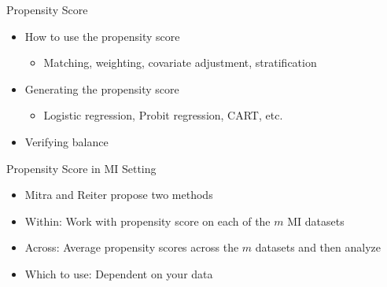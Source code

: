 \begin{frame}{Propensity Score}
\begin{itemize}
 \item How to use the propensity score
 \begin{itemize}
  \item Matching, weighting, covariate adjustment, stratification
 \end{itemize}
\item Generating the propensity score
\begin{itemize}
 \item Logistic regression, Probit regression, CART, etc.
\end{itemize}
\item Verifying balance
\end{itemize} 
\end{frame}

\begin{frame}{Propensity Score in MI Setting}
\begin{itemize}
 \item Mitra and Reiter propose two methods \cite{Mitra2012}
 \item Within: Work with propensity score on each of the $m$ MI datasets
 \item Across: Average propensity scores across the $m$ datasets and then analyze
 \item Which to use: Dependent on your data
\end{itemize}

 
\end{frame}
